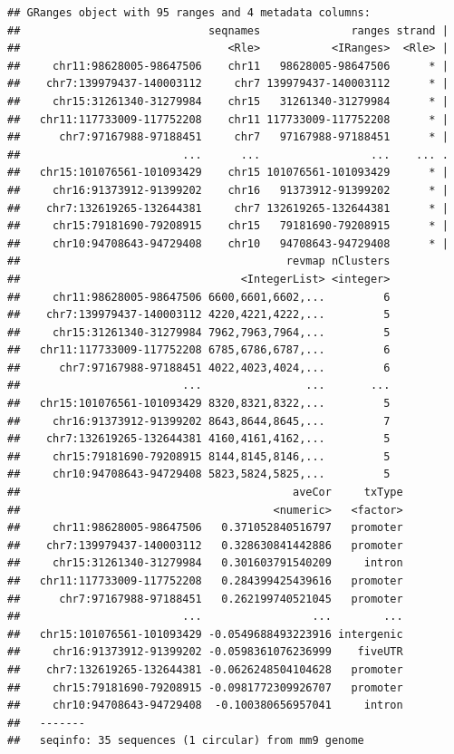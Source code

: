 \documentclass[9pt,a4paper,]{extarticle}
\newenvironment{Shaded}{\begin{snugshade}}{\end{snugshade}}
\newcommand{\KeywordTok}[1]{\textcolor[rgb]{0.13,0.29,0.53}{\textbf{{#1}}}}
\newcommand{\DataTypeTok}[1]{\textcolor[rgb]{0.13,0.29,0.53}{{#1}}}
\newcommand{\StringTok}[1]{\textcolor[rgb]{0.31,0.60,0.02}{{#1}}}
\newcommand{\CommentTok}[1]{\textcolor[rgb]{0.56,0.35,0.01}{\textit{{#1}}}}
\newcommand{\OtherTok}[1]{\textcolor[rgb]{0.56,0.35,0.01}{{#1}}}
\newcommand{\NormalTok}[1]{{#1}}
\begin{document}
\begin{Shaded}
\end{Shaded}

\begin{verbatim}
## GRanges object with 95 ranges and 4 metadata columns:
##                             seqnames              ranges strand |
##                                <Rle>           <IRanges>  <Rle> |
##     chr11:98628005-98647506    chr11   98628005-98647506      * |
##    chr7:139979437-140003112     chr7 139979437-140003112      * |
##     chr15:31261340-31279984    chr15   31261340-31279984      * |
##   chr11:117733009-117752208    chr11 117733009-117752208      * |
##      chr7:97167988-97188451     chr7   97167988-97188451      * |
##                         ...      ...                 ...    ... .
##   chr15:101076561-101093429    chr15 101076561-101093429      * |
##     chr16:91373912-91399202    chr16   91373912-91399202      * |
##    chr7:132619265-132644381     chr7 132619265-132644381      * |
##     chr15:79181690-79208915    chr15   79181690-79208915      * |
##     chr10:94708643-94729408    chr10   94708643-94729408      * |
##                                         revmap nClusters
##                                  <IntegerList> <integer>
##     chr11:98628005-98647506 6600,6601,6602,...         6
##    chr7:139979437-140003112 4220,4221,4222,...         5
##     chr15:31261340-31279984 7962,7963,7964,...         5
##   chr11:117733009-117752208 6785,6786,6787,...         6
##      chr7:97167988-97188451 4022,4023,4024,...         6
##                         ...                ...       ...
##   chr15:101076561-101093429 8320,8321,8322,...         5
##     chr16:91373912-91399202 8643,8644,8645,...         7
##    chr7:132619265-132644381 4160,4161,4162,...         5
##     chr15:79181690-79208915 8144,8145,8146,...         5
##     chr10:94708643-94729408 5823,5824,5825,...         5
##                                          aveCor     txType
##                                       <numeric>   <factor>
##     chr11:98628005-98647506   0.371052840516797   promoter
##    chr7:139979437-140003112   0.328630841442886   promoter
##     chr15:31261340-31279984   0.301603791540209     intron
##   chr11:117733009-117752208   0.284399425439616   promoter
##      chr7:97167988-97188451   0.262199740521045   promoter
##                         ...                 ...        ...
##   chr15:101076561-101093429 -0.0549688493223916 intergenic
##     chr16:91373912-91399202 -0.0598361076236999    fiveUTR
##    chr7:132619265-132644381 -0.0626248504104628   promoter
##     chr15:79181690-79208915 -0.0981772309926707   promoter
##     chr10:94708643-94729408  -0.100380656957041     intron
##   -------
##   seqinfo: 35 sequences (1 circular) from mm9 genome
\end{verbatim}
\end{document}
